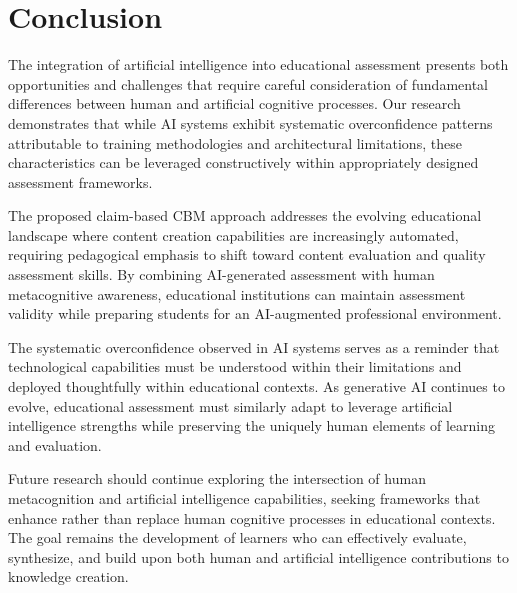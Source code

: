 \documentclass[sigconf]{acmart}
\begin{document}
\section{Conclusion}

The integration of artificial intelligence into educational assessment presents both opportunities and challenges that require careful consideration of fundamental differences between human and artificial cognitive processes. Our research demonstrates that while AI systems exhibit systematic overconfidence patterns attributable to training methodologies and architectural limitations, these characteristics can be leveraged constructively within appropriately designed assessment frameworks.

The proposed claim-based CBM approach addresses the evolving educational landscape where content creation capabilities are increasingly automated, requiring pedagogical emphasis to shift toward content evaluation and quality assessment skills. By combining AI-generated assessment with human metacognitive awareness, educational institutions can maintain assessment validity while preparing students for an AI-augmented professional environment.

The systematic overconfidence observed in AI systems serves as a reminder that technological capabilities must be understood within their limitations and deployed thoughtfully within educational contexts. As generative AI continues to evolve, educational assessment must similarly adapt to leverage artificial intelligence strengths while preserving the uniquely human elements of learning and evaluation.

Future research should continue exploring the intersection of human metacognition and artificial intelligence capabilities, seeking frameworks that enhance rather than replace human cognitive processes in educational contexts. The goal remains the development of learners who can effectively evaluate, synthesize, and build upon both human and artificial intelligence contributions to knowledge creation.



\end{document}
